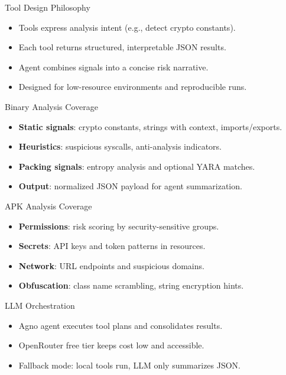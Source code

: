 \documentclass{beamer}
\begin{document}
\begin{frame}{Tool Design Philosophy}
  \begin{itemize}
    \item Tools express analysis intent (e.g., detect crypto constants).
    \item Each tool returns structured, interpretable JSON results.
    \item Agent combines signals into a concise risk narrative.
    \item Designed for low-resource environments and reproducible runs.
  \end{itemize}
\end{frame}

\begin{frame}{Binary Analysis Coverage}
  \begin{itemize}
    \item \textbf{Static signals}: crypto constants, strings with context, imports/exports.
    \item \textbf{Heuristics}: suspicious syscalls, anti-analysis indicators.
    \item \textbf{Packing signals}: entropy analysis and optional YARA matches.
    \item \textbf{Output}: normalized JSON payload for agent summarization.
  \end{itemize}
\end{frame}

\begin{frame}{APK Analysis Coverage}
  \begin{itemize}
    \item \textbf{Permissions}: risk scoring by security-sensitive groups.
    \item \textbf{Secrets}: API keys and token patterns in resources.
    \item \textbf{Network}: URL endpoints and suspicious domains.
    \item \textbf{Obfuscation}: class name scrambling, string encryption hints.
  \end{itemize}
\end{frame}

\begin{frame}{LLM Orchestration}
  \begin{itemize}
    \item Agno agent executes tool plans and consolidates results.
    \item OpenRouter free tier keeps cost low and accessible.
    \item Fallback mode: local tools run, LLM only summarizes JSON.
  \end{itemize}
\end{frame}
\end{document}
